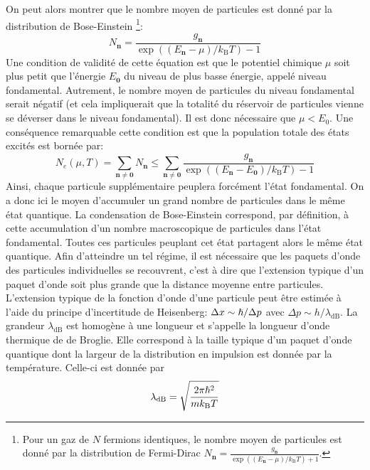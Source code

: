 On peut alors montrer que le nombre moyen de particules est donné par la distribution de Bose-Einstein \footnote{Pour un gaz de $N$ fermions identiques, le nombre moyen de particules est donné par la distribution de Fermi-Dirac $ N_{\mathbf{n}}=\frac{g_{\mathbf{n}}}{\exp{\left( (E_{\mathbf{n}}-\mu)/k_{\mathrm{B}}T\right)}+1}$.}:\citep{diu1989elements}
\begin{equation}
N_{\mathbf{n}}=\frac{g_{\mathbf{n}}}{\exp{\left( (E_{\mathbf{n}}-\mu)/k_{\mathrm{B}}T \right)}-1}
\end{equation}
Une condition de validité de cette équation est que le potentiel chimique $\mu$ soit plus petit que l'énergie $E_{\mathbf{0}}$ du niveau de plus basse énergie, appelé niveau fondamental. Autrement, le nombre moyen de particules du niveau fondamental serait négatif (et cela impliquerait que la totalité du réservoir de particules vienne se déverser dans le niveau fondamental). Il est donc nécessaire que $\mu < E_0$. Une conséquence remarquable cette condition est que la population totale des états excités est bornée par:
\begin{equation}
N_e(\mu,T)=\sum_{\mathbf{n}\neq\mathbf{0}} N_{\mathbf{n}} \leq \sum_{\mathbf{n} \neq \mathbf{0}} \frac{g_{\mathbf{n}}}{\exp{\left( (E_{\mathbf{n}}-E_{\mathbf{0}})/k_{\mathrm{B}}T \right)}-1}
\end{equation}
Ainsi, chaque particule supplémentaire peuplera forcément l'état fondamental. On a donc ici le moyen d'accumuler un grand nombre de particules dans le même état quantique. La condensation de Bose-Einstein correspond, par définition, à cette accumulation d'un nombre macroscopique de particules dans l'état fondamental. Toutes ces particules peuplant cet état partagent alors le même état quantique. Afin d'atteindre un tel régime, il est nécessaire que les paquets d'onde des particules individuelles se recouvrent, c'est à dire que l'extension typique d'un paquet d'onde soit plus grande que la distance moyenne entre particules. L'extension typique de la fonction d'onde d'une particule peut être estimée à l'aide du principe d'incertitude de Heisenberg: $\Delta x \sim \hslash / \Delta p$ avec $\Delta p \sim h/\lambda_{\mathrm{dB}}$. La grandeur $\lambda_{\mathrm{dB}}$ est homogène à une longueur et s'appelle la longueur d'onde thermique de de Broglie. Elle correspond à la taille typique d'un paquet d'onde quantique dont la largeur de la distribution en impulsion est donnée par la température. Celle-ci est donnée par \citep{diu1989elements}
\begin{equation}
\lambda_{\mathrm{dB}}=\sqrt{\frac{2\pi \hslash^2}{m k_{\mathrm{B}}T}}
\end{equation}
